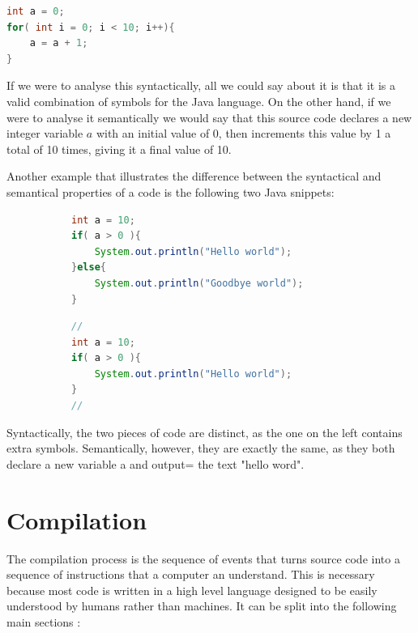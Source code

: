 \documentclass[ %
                    author={Jonathan Rankin},
                supervisor={Dr. David May, Dr. Ian Holyer},
                    degree={MEng},
                     title={CodeTouch},
                  subtitle={A Revolutionary Way To Program Real Code On Touch Screen Devices},
                      type={enterprise},
                      year={2015 } ]{dissertation}
\begin{document}
\begin{lstlisting}[language=Java]
int a = 0;
for( int i = 0; i < 10; i++){
    a = a + 1;
}
\end{lstlisting}

If we were to analyse this syntactically, all we could say about it is that it is a valid combination of symbols for the Java language. On the other hand, if we were to analyse it semantically we would say that this source code declares a new integer variable $a$ with an initial value of 0, then increments this value by 1 a total of 10 times, giving it a final value of 10. 

Another example that illustrates the difference between the syntactical and semantical properties of a code is the following two Java snippets:

\begin{figure}[h]
\centering
\begin{subfigure}{0.5\textwidth}
  \centering

\begin{lstlisting}[language=Java]
int a = 10;
if( a > 0 ){
    System.out.println("Hello world");
}else{
    System.out.println("Goodbye world");
}
\end{lstlisting}


\end{subfigure}%
\begin{subfigure}{0.5\textwidth}
  \centering
\begin{lstlisting}[language=Java]
//
int a = 10;
if( a > 0 ){
    System.out.println("Hello world");
}
//
\end{lstlisting}


\end{subfigure}
\label{fig:success}
\end{figure}

Syntactically, the two pieces of code are distinct, as the one on the left contains extra symbols. Semantically, however, they are exactly the same, as they both declare a new variable a and output= the text "hello word".





\section{Compilation}
The compilation process is the sequence of events that turns source code into a sequence of instructions that a computer an understand. This is necessary because most code is written in a high level language designed to be easily understood by humans rather than machines. It can be split into the following main sections \cite{compiler}:
\end{document}
